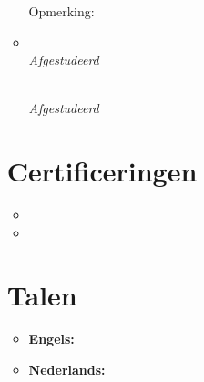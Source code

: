 \documentclass[11pt,a4paper]{article}
\begin{document}
\begin{itemize}[leftmargin=0pt,label={},itemsep=2em,topsep=0pt]
\begin{itemize}[leftmargin=0pt,label={},itemsep=2em]
{\color{secondary}Opmerking:} \textit{\MastersNotableAchievementNL}


\item \parbox{\textwidth}{\textbf{\BatchelorsUniversityNL} \hfill \textit{\BatchelorsLocationNL}}\\
\textit{\BatchelorsCourseNL} \hfill \textit{Afgestudeerd \BatchelorsGraduationNL}
\parbox{\textwidth}{\textbf{\HEAOHogeschoolNL} \hfill \textit{\HEAOsLocationNL}}\\
\textit{\HEAOCourseNL} \hfill \textit{Afgestudeerd \BatchelorsGraduationNL}
\end{itemize}



\vspace{0.5cm}
\section{Certificeringen}
\begin{itemize}[leftmargin=*,topsep=-6pt,parsep=0pt,partopsep=0pt,itemsep=0pt]
\item \CertMicrosoftNL
\item \CertDutch
\end{itemize}


\vspace{0.5cm}
\section{Talen}
\begin{itemize}[leftmargin=*]
\item \textbf{Engels:} \LangEnglishNL
\item \textbf{Nederlands:} \LangDutchNL
\end{itemize} 

\end{itemize}
\end{document}
